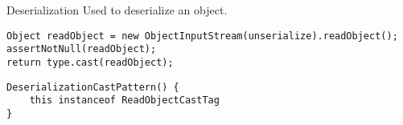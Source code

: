 \begin{pattern}{Deserialization}
Used to deserialize an object.

\instances


\begin{lstlisting}[style=java,caption={Instance of the \pname{} pattern  (\url{http://bit.ly/2KOpj3A}) }]
Object readObject = new ObjectInputStream(unserialize).readObject();
assertNotNull(readObject);
return type.cast(readObject);
\end{lstlisting}

\detection

\begin{lstlisting}[style=ql]
DeserializationCastPattern() {
    this instanceof ReadObjectCastTag
}
\end{lstlisting}

\end{pattern}
